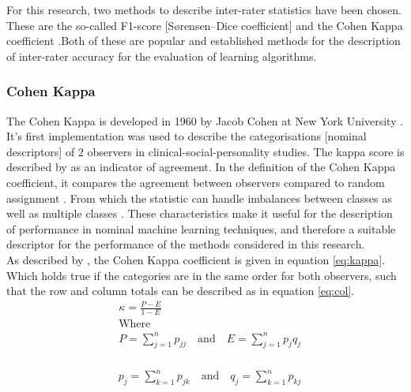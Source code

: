 \noindent For this research, two methods to describe inter-rater statistics have been chosen. These are the so-called F1-score [Sørensen–Dice coefficient] and the Cohen Kappa coefficient \citep{Dice1945,Sorensen1948,Cohen1960}.Both of these are popular and established methods for the description of inter-rater accuracy for the evaluation of learning algorithms.

\subsubsection*{Cohen Kappa}
The Cohen Kappa is developed in 1960 by Jacob Cohen at New York University \citep{Cohen1960}. It's first implementation was used to describe the categorisations [nominal descriptors] of 2 observers in clinical-social-personality studies. The kappa score is described by \cite{Cohen1960} as an indicator of agreement. In the definition of the Cohen Kappa coefficient, it compares the agreement between observers compared to random assignment \citep{Warrens2011}. From which the statistic can handle imbalances between classes as well as multiple classes \citep{Kampakis2016}. These characteristics make it useful for the description of performance in nominal machine learning techniques, and therefore a suitable descriptor for the performance of the methods considered in this research.\\

\noindent As described by \citet{Warrens2011}, the Cohen Kappa coefficient is given in equation \ref{eq:kappa}. Which holds true if the categories are in the same order for both observers, such that the row and column totals can be described as in equation \ref{eq:col}.
\begin{equation}
	\begin{split}
		&\kappa = \frac{P - E}{1 - E} \\
		&\text{Where} \\
		&P = \sum_{j=1}^{n} p_{jj} \quad\text{and}\quad E= \sum_{j=1}^{n} p_jq_j \\
	\end{split}
	\label{eq:kappa}
\end{equation}

\begin{equation}
	\begin{split}
		&p_j = \sum_{k=1}^{n} p_{jk}  \quad\text{and}\quad q_j = \sum_{k=1}^{n} p_{kj}
	\end{split}
	\label{eq:col}
\end{equation}

